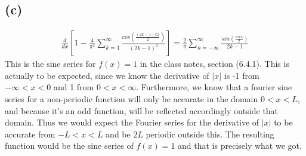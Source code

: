 \documentclass{article}
\begin{document}
\subsection*{\textbf{(c)}}
\begin{equation}
\begin{aligned}
\frac{d}{dx}[1 - \frac{4}{\pi^2}\sum_{k=1}^{\infty}\frac{cos(\frac{(2k-1)\pi x}{2})}{(2k-1)^2}] = \frac{2}{\pi}\sum_{n=-\infty}^{\infty}\frac{sin(\frac{n\pi x}{2})}{2k-1}
\end{aligned}
\end{equation}
This is the sine series for $f(x) =1$ in the class notes, section (6.4.1). This is actually to be expected, since we know the derivative of $|x|$ is -1 from $-\infty < x < 0$ and 1 from $0<x<\infty$. Furthermore, we know that a fourier sine series for a non-periodic function will only be accurate in the domain $0 < x< L$, and because it's an odd function, will be reflected accordingly outside that domain. Thus we would expect the Fourier series for the derivative of $|x|$ to be accurate from $-L < x < L$ and be $2L$ periodic outside this. The resulting function would be the sine series of $f(x) = 1$ and that is precisely what we got.
\end{document}
